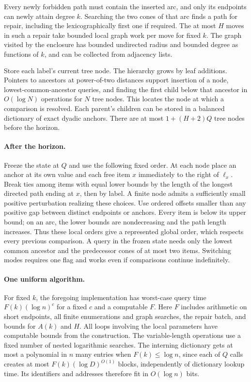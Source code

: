 \documentclass[11pt,a4paper]{article}
\begin{document}
\newpage
Every newly forbidden path must contain the inserted arc, and only its
endpoints can newly attain degree $k$. Searching the two cones of that arc
finds a path for repair, including the lexicographically first one if required.
The at most $H$ moves in such a repair take bounded local graph work per move
for fixed $k$. The graph visited by the enclosure has bounded undirected
radius and bounded degree as functions of $k$, and can be collected from
adjacency lists.

Store each label's current tree node. The hierarchy grows by leaf additions.
Pointers to ancestors at power-of-two distances support insertion of a node,
lowest-common-ancestor queries, and finding the first child below that ancestor
in $O(\log N)$ operations for $N$ tree nodes. This locates the node at which a
comparison is resolved. Each parent's children can be stored in a balanced
dictionary of exact dyadic anchors. There are at most $1+(H+2)Q$ tree nodes
before the horizon.

\paragraph{After the horizon.}
Freeze the state at $Q$ and use the following fixed order. At each node place
an anchor at its own value and each free item $x$ immediately to the right of
$\ell_x$. Break ties among items with equal lower bounds by the length of the
longest directed path ending at $x$, then by label. A finite node admits a
sufficiently small positive perturbation realizing these choices. Use ordered
offsets smaller than any positive gap between distinct endpoints or anchors.
Every item is below its upper bound; on an arc, the lower bounds are
nondecreasing and the path length increases. Thus these local orders give a
represented global order, which respects every previous comparison. A query in
the frozen state needs only the lowest common ancestor and the predecessor
cones of at most two items. Switching modes requires one flag and works even
if comparisons continue indefinitely.

\paragraph{One uniform algorithm.}
For fixed $k$, the foregoing implementation has worst-case query time
$F(k)(\log n)^c$ for a fixed $c$ and a computable $F$. Here $F$ includes
arithmetic on short endpoints, all finite enumerations and graph searches,
the repair batch, and bounds for $A(k)$ and $H$. All loops involving the local
parameters have computable bounds from the construction. The variable-length
operations use a fixed number of nested logarithmic searches. The interning
dictionary gets at most a polynomial in $n$ many entries when $F(k)\le\log n$,
since each of $Q$ calls creates at most $F(k)(\log D)^{O(1)}$ blocks,
independently of dictionary lookup time. Its identifiers and addresses therefore
fit in $O(\log n)$ bits.
\end{document}
